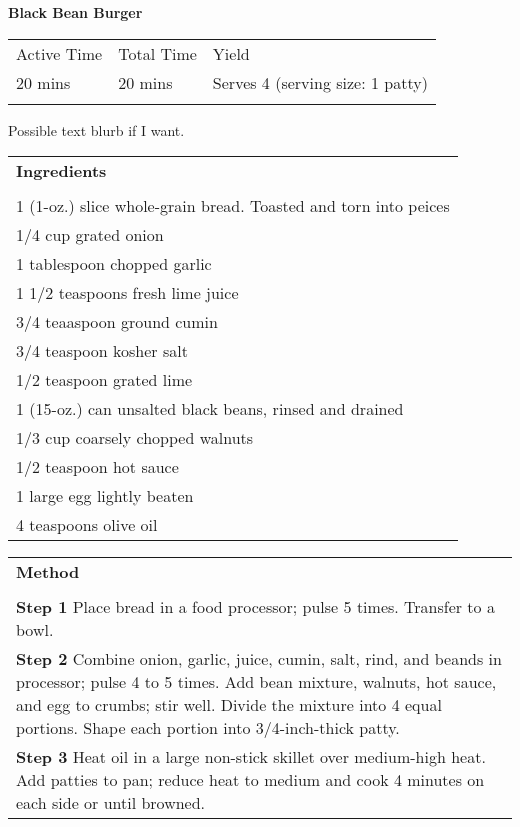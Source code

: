 \documentclass[11pt]{article}
\begin{document}
{\Huge \textbf{Black Bean Burger}\par}
\vspace{1em}
\begin{tabular}{@{}l l l}
  \hline
  \noalign{\smallskip}
  Active Time & Total Time & Yield \\
  20 mins & 20 mins & Serves 4 (serving size: 1 patty) \\
  \noalign{\smallskip}
  \hline
\end{tabular}

\vspace{2em}
Possible text blurb if I want.
\vspace{2em}

\begin{tabular}[t]{ p{5cm} }
  \textbf{Ingredients} \\
  \\
  1 (1-oz.) slice whole-grain bread. Toasted and torn into peices \\
  1/4 cup grated onion \\
  1 tablespoon chopped garlic \\
  1 1/2 teaspoons fresh lime juice \\
  3/4 teaaspoon ground cumin \\
  3/4 teaspoon kosher salt \\
  1/2 teaspoon grated lime \\
  1 (15-oz.) can unsalted black beans, rinsed and drained \\
  1/3 cup coarsely chopped walnuts \\
  1/2 teaspoon hot sauce \\
  1 large egg lightly beaten \\
  4 teaspoons olive oil \\
\end{tabular}
\begin{tabular}[t]{ p{10cm} }
  \textbf{Method} \\
  \\
  \textbf{Step 1} \hspace{3mm} Place bread in a food processor; pulse 5 times. Transfer to a bowl. \\[5mm]
  \textbf{Step 2} \hspace{3mm} Combine onion, garlic, juice, cumin, salt, rind, and beands in processor; pulse 4 to 5 times. Add bean mixture, walnuts, hot sauce, and egg to crumbs; stir well. Divide the mixture into 4 equal portions. Shape each portion into 3/4-inch-thick patty. \\[5mm]
  \textbf{Step 3} \hspace{3mm} Heat oil in a large non-stick skillet over medium-high heat. Add patties to pan; reduce heat to medium and cook 4 minutes on each side or until browned. \\
\end{tabular}
\end{document}
